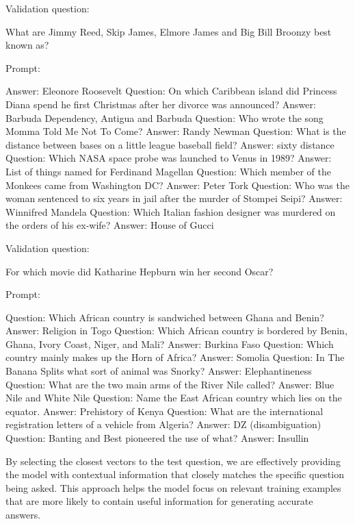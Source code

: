 Validation question:

What are Jimmy Reed, Skip James, Elmore James and Big Bill Broonzy best known as?

Prompt:

Answer: Eleonore Roosevelt
Question: On which Caribbean island did Princess Diana spend he first Christmas after her divorce was announced?
Answer: Barbuda Dependency, Antigua and Barbuda
Question: Who wrote the song Momma Told Me Not To Come?
Answer: Randy Newman
Question: What is the distance between bases on a little league baseball field?
Answer: sixty  distance
Question: Which NASA space probe was launched to Venus in 1989?
Answer: List of things named for Ferdinand Magellan
Question: Which member of the Monkees came from Washington DC?
Answer: Peter Tork
Question: Who was the woman sentenced to six years in jail after the murder of Stompei Seipi?
Answer: Winnifred Mandela
Question: Which Italian fashion designer was murdered on the orders of his ex-wife?
Answer: House of Gucci

Validation question:

For which movie did Katharine Hepburn win her second Oscar?

Prompt:

Question: Which African country is sandwiched between Ghana and Benin?
Answer: Religion in Togo
Question: Which African country is bordered by Benin, Ghana, Ivory Coast, Niger, and Mali?
Answer: Burkina Faso
Question: Which country mainly makes up the Horn of Africa?
Answer: Somolia
Question: In The Banana Splits what sort of animal was Snorky?
Answer: Elephantineness
Question: What are the two main arms of the River Nile called?
Answer: Blue Nile and White Nile
Question: Name the East African country which lies on the equator.
Answer: Prehistory of Kenya
Question: What are the international registration letters of a vehicle from Algeria?
Answer: DZ (disambiguation)
Question: Banting and Best pioneered the use of what?
Answer: Insullin


By selecting the closest vectors to the test question, we are effectively providing the model with contextual information that closely matches the specific question being asked. This approach helps the model focus on relevant training examples that are more likely to contain useful information for generating accurate answers.